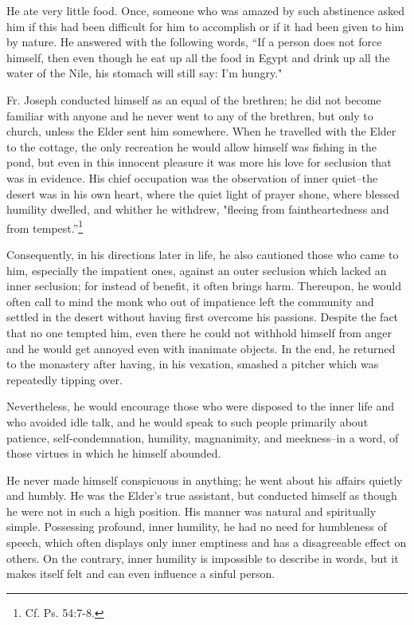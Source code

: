 He ate very little food. Once, someone who was amazed by such abstinence asked him if this had been difficult for him to accomplish or if it had been given to him by nature. He answered with the following words, “If a person does not force himself, then even though he eat up all the food in Egypt and drink up all the water of the Nile, his stomach will still say: I'm hungry."

Fr. Joseph conducted himself as an equal of the brethren; he did not become familiar with anyone and he never went to any of the brethren, but only to church, unless the Elder sent him somewhere. When he travelled with the Elder to the cottage, the only recreation he would allow himself was fishing in the pond, but even in this innocent pleasure it was more his love for seclusion that was in evidence. His chief occupation was the observation of inner quiet--the desert was in his own heart, where the quiet light of prayer shone, where blessed humility dwelled, and whither he withdrew, "fleeing from faintheartedness and from tempest.''\footnote{Cf. Ps. 54:7-8.}

Consequently, in his directions later in life, he also cautioned those who came to him, especially the impatient ones, against an outer seclusion which lacked an inner seclusion; for instead of benefit, it often brings harm. Thereupon, he would often call to mind the monk who out of impatience left the community and settled in the desert without having first overcome his passions. Despite the fact that no one tempted him, even there he could not withhold himself from anger and he would get annoyed even with inanimate objects. In the end, he returned to the monastery after having, in his vexation, smashed a pitcher which was repeatedly tipping over.

Nevertheless, he would encourage those who were disposed to the inner life and who avoided idle talk, and he would speak to such people primarily about patience, self-condemnation, humility, magnanimity, and meekness--in a word, of those virtues in which he himself abounded.

He never made himself conspicuous in anything; he went about his affairs quietly and humbly. He was the Elder's true assistant, but conducted himself as though he were not in such a high position. His manner was natural and spiritually simple. Possessing profound, inner humility, he had no need for humbleness of speech, which often displays only inner emptiness and has a disagreeable effect on others. On the contrary, inner humility is impossible to describe in words, but it makes itself felt and can even influence a sinful person.

